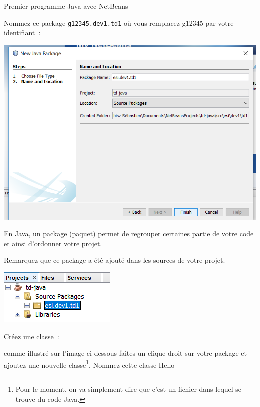 \documentclass[a4paper,11pt]{article}
\begin{document}
\begin{Tutoriel}{Premier programme Java avec NetBeans}
\begin{steps}
			Nommez ce package \texttt{g12345.dev1.td1} où vous remplacez g12345 par votre identifiant~:
			
			\bigskip
			\begin{center}
				\includegraphics[width=\textwidth]{images/nb_newproject_package2}
			\end{center}
			
			En Java, un package (paquet) permet de regrouper certaines partie de votre code
			et ainsi d'ordonner votre projet.

			Remarquez que ce package a été ajouté dans les sources de votre projet. 
			\bigskip
			\begin{center}
				\includegraphics{images/nb_newproject_package3}
			\end{center}
			


		\item Créez une classe~:
		
			comme illustré sur l'image ci-dessous faites un clique droit sur votre package 
			et ajoutez une nouvelle classe\footnote{Pour le moment, 
			on va simplement dire que c'est un fichier dans lequel se trouve du code Java.}. 
			Nommez cette classe {Hello}
		

\end{steps}
\end{Tutoriel}
\end{document}
